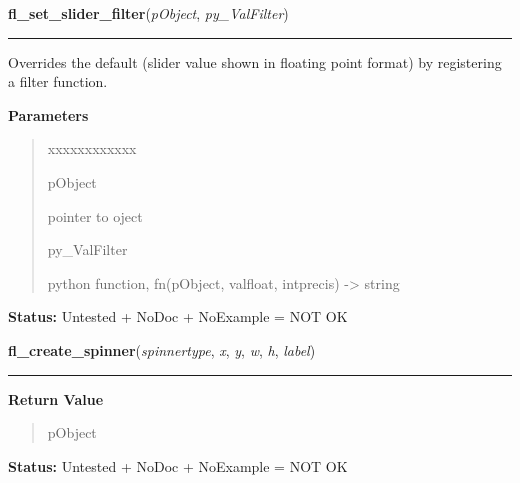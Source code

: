 \hspace{.8\funcindent}\begin{boxedminipage}{\funcwidth}

    \raggedright \textbf{fl\_set\_slider\_filter}(\textit{pObject}, \textit{py\_ValFilter})

    \vspace{-1.5ex}

    \rule{\textwidth}{0.5\fboxrule}
\setlength{\parskip}{2ex}
    Overrides the default (slider value shown in floating point format) by 
    registering a filter function.

\setlength{\parskip}{1ex}
      \textbf{Parameters}
      \vspace{-1ex}

      \begin{quote}
        \begin{Ventry}{xxxxxxxxxxxx}

          \item[pObject]

          pointer to oject

          \item[py\_ValFilter]

          python function, fn(pObject, valfloat, intprecis) -{\textgreater}
          string

        \end{Ventry}

      \end{quote}

\textbf{Status:} Untested + NoDoc + NoExample = NOT OK



    \end{boxedminipage}

    \label{xformslib:library:fl_create_spinner}

    \vspace{0.5ex}

\hspace{.8\funcindent}\begin{boxedminipage}{\funcwidth}

    \raggedright \textbf{fl\_create\_spinner}(\textit{spinnertype}, \textit{x}, \textit{y}, \textit{w}, \textit{h}, \textit{label})

    \vspace{-1.5ex}

    \rule{\textwidth}{0.5\fboxrule}
\setlength{\parskip}{2ex}
\setlength{\parskip}{1ex}
      \textbf{Return Value}
    \vspace{-1ex}

      \begin{quote}
      pObject

      \end{quote}

\textbf{Status:} Untested + NoDoc + NoExample = NOT OK



    \end{boxedminipage}

